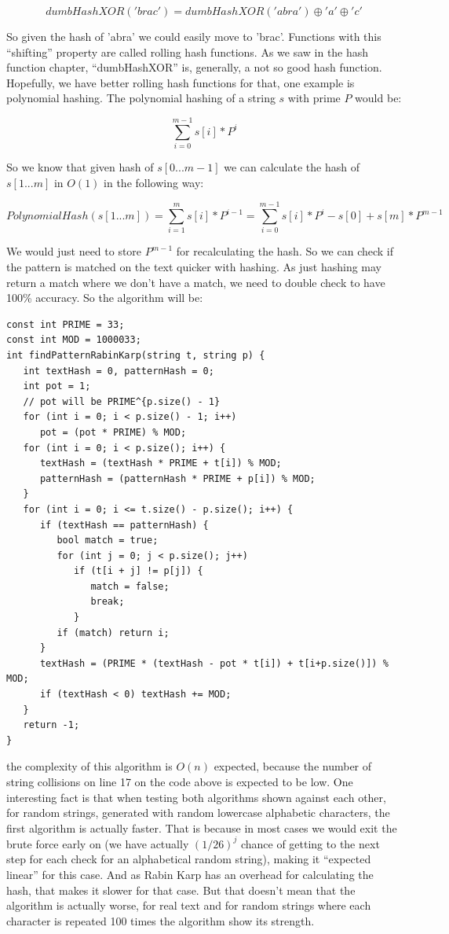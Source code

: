 \[ dumbHashXOR('brac') = dumbHashXOR('abra') \oplus 'a' \oplus 'c' \]

So given the hash of 'abra' we could easily move to 'brac'. Functions with this ``shifting'' property are called rolling hash functions. As we saw in the hash function chapter, ``dumbHashXOR'' is, generally, a not so good hash function. Hopefully, we have better rolling hash functions for that, one example is polynomial hashing. The polynomial hashing of a string \( s \) with prime \( P \) would be:

\[ \sum_{i=0}^{m-1}s[i]*P^{i} \]

So we know that given hash of \( s[0...m-1] \) we can calculate the hash of \( s[1...m] \) in \( O(1) \) in the following way:

\[ PolynomialHash(s[1...m]) = \sum_{i=1}^{m}s[i]*P^{i-1} = \sum_{i=0}^{m-1}s[i]*P^{i} - s[0] + s[m] * P^{m-1} \]

We would just need to store \( P^{m-1} \) for recalculating the hash. So we can check if the pattern is matched on the text quicker with hashing. As just hashing may return a match where we don't have a match, we need to double check to have 100\% accuracy. So the algorithm will be:

\newpage

\begin{lstlisting}
const int PRIME = 33;
const int MOD = 1000033;
int findPatternRabinKarp(string t, string p) {
   int textHash = 0, patternHash = 0;
   int pot = 1;
   // pot will be PRIME^{p.size() - 1}
   for (int i = 0; i < p.size() - 1; i++)
      pot = (pot * PRIME) % MOD;
   for (int i = 0; i < p.size(); i++) {
      textHash = (textHash * PRIME + t[i]) % MOD;
      patternHash = (patternHash * PRIME + p[i]) % MOD;
   }
   for (int i = 0; i <= t.size() - p.size(); i++) {
      if (textHash == patternHash) {
         bool match = true;
         for (int j = 0; j < p.size(); j++)
            if (t[i + j] != p[j]) {
               match = false;
               break;
            }
         if (match) return i;
      }
      textHash = (PRIME * (textHash - pot * t[i]) + t[i+p.size()]) % MOD;
      if (textHash < 0) textHash += MOD;
   }
   return -1;
}
\end{lstlisting}

the complexity of this algorithm is \( O(n) \) expected, because the number of string collisions on line 17 on the code above is expected to be low. One interesting fact is that when testing both algorithms shown against each other, for random strings, generated with random lowercase alphabetic characters, the first algorithm is actually faster. That is because in most cases we would exit the brute force early on (we have actually \( (1/26)^j \) chance of getting to the next step for each check for an alphabetical random string), making it ``expected linear'' for this case. And as Rabin Karp has an overhead for calculating the hash, that makes it slower for that case. But that doesn't mean that the algorithm is actually worse, for real text and for random strings where each character is repeated 100 times the algorithm show its strength.


